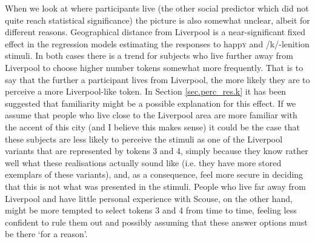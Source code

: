 When we look at where participants live (the other social predictor which did not quite reach statistical significance) the picture is also somewhat unclear, albeit for different reasons.
Geographical distance from Liverpool is a near-significant fixed effect in the regression models estimating the responses to happ\textsc{y} and /k/-lenition stimuli.
In both cases there is a trend for subjects who live further away from Liverpool to choose higher number tokens somewhat more frequently.
That is to say that the further a participant lives from Liverpool, the more likely they are to perceive a more Liverpool-like token.
In Section \ref{sec.perc_res.k} it has been suggested that familiarity might be a possible explanation for this effect.
If we assume that people who live close to the Liverpool area are more familiar with the accent of this city (and I believe this makes sense) it could be the case that these subjects are less likely to perceive the stimuli as one of the Liverpool variants that are represented by tokens 3 and 4, simply because they know rather well what these realisations actually sound like (i.e. they have more stored exemplars of these variants), and, as a consequence, feel more secure in deciding that this is not what was presented in the stimuli.
People who live far away from Liverpool and have little personal experience with Scouse, on the other hand, might be more tempted to select tokens 3 and 4 from time to time, feeling less confident to rule them out and possibly assuming that these answer options must be there `for a reason'.

